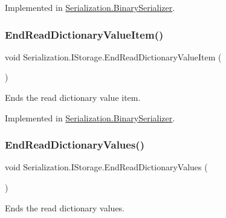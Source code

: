 Implemented in \hyperlink{class_serialization_1_1_binary_serializer_ab8d362901844c2b1aa7420269f72fa50}{Serialization.\+Binary\+Serializer}.

\mbox{\label{interface_serialization_1_1_i_storage_a34f240c50bd8a6811cdde7d564fab443}} 
\subsubsection{\texorpdfstring{End\+Read\+Dictionary\+Value\+Item()}{EndReadDictionaryValueItem()}}
{\footnotesize\ttfamily void Serialization.\+I\+Storage.\+End\+Read\+Dictionary\+Value\+Item (\begin{DoxyParamCaption}{ }\end{DoxyParamCaption})}



Ends the read dictionary value item. 



Implemented in \hyperlink{class_serialization_1_1_binary_serializer_aa8214913ce84b050614e38c5aadc0b71}{Serialization.\+Binary\+Serializer}.

\mbox{\label{interface_serialization_1_1_i_storage_af76c715808ff9cca9b89c995a556ec6b}} 
\subsubsection{\texorpdfstring{End\+Read\+Dictionary\+Values()}{EndReadDictionaryValues()}}
{\footnotesize\ttfamily void Serialization.\+I\+Storage.\+End\+Read\+Dictionary\+Values (\begin{DoxyParamCaption}{ }\end{DoxyParamCaption})}



Ends the read dictionary values. 



